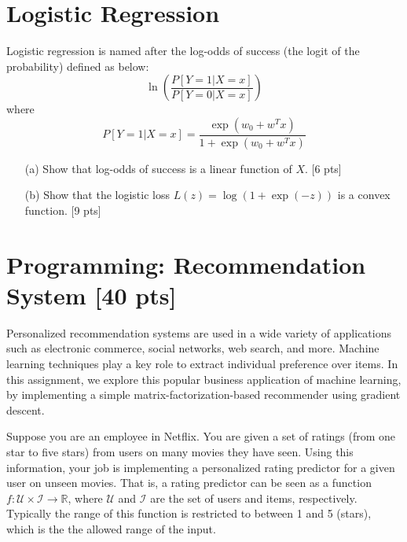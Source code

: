 \documentclass[12pt]{article}
\begin{document}
\section{Logistic Regression} 
Logistic regression is named after the log-odds of success (the logit of the probability) defined as below:
\begin{equation}
\ln \left( \frac{P[Y=1|X=x]}{P[Y=0|X=x]}\right) \nonumber
\end{equation}
where 
\[P[Y=1|X=x]=\frac{\exp(w_0+w^Tx)}{1+\exp(w_0+w^Tx)}\]

\begin{itemize}
\item[(a)] Show that log-odds of success is a linear function of $X$. [6 pts]

\item[(b)] Show that the logistic loss $L(z) = \log \left(  1 + \exp(-z)  \right)$ is a convex function. [9 pts]
\end{itemize}


\section{Programming: Recommendation System [40 pts]}

Personalized recommendation systems are used in a wide variety of
applications such as electronic commerce, social networks, web
search, and more. Machine learning techniques play a key role to
extract individual preference over items. In this assignment, we
explore this popular business application of machine learning, by
implementing a simple matrix-factorization-based recommender using
gradient descent.

Suppose you are an employee in Netflix. You are given a set of
ratings (from one star to five stars) from users on many movies they
have seen. Using this information, your job is implementing a
personalized rating predictor for a given user on unseen movies.
That is, a rating predictor can be seen as a function $f:
\mathcal{U} \times \mathcal{I} \rightarrow \mathbb{R}$, where
$\mathcal{U}$ and $\mathcal{I}$ are the set of users and items,
respectively. Typically the range of this function is restricted to
between 1 and 5 (stars), which is the the allowed range of the
input.
\end{document}
